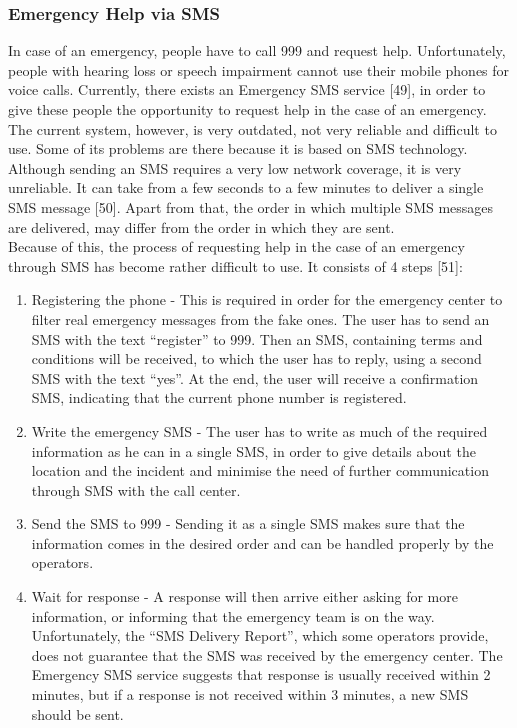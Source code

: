 \documentclass{article}
\begin{document}
\subsubsection{Emergency Help via SMS}
In case of an emergency, people have to call 999 and request help. Unfortunately, people with hearing loss or speech impairment cannot use their mobile phones for voice calls. Currently, there exists an Emergency SMS service [49], in order to give these people the opportunity to request help in the case of an emergency.\\

The current system, however, is very outdated, not very reliable and difficult to use. Some of its problems are there because it is based on SMS technology. Although sending an SMS requires a very low network coverage, it is very unreliable. It can take from a few seconds to a few minutes to deliver a single SMS message [50]. Apart from that, the order in which multiple SMS messages are delivered, may differ from the order in which they are sent. \\

Because of this, the process of requesting help in the case of an emergency through SMS has become rather difficult to use. It consists of 4 steps [51]:
\begin{enumerate}
\item Registering the phone - This is required in order for the emergency center to filter real emergency messages from the fake ones. The user has to send an SMS with the text “register” to 999. Then an SMS, containing terms and conditions will be received, to which the user has to reply, using a second SMS with the text “yes”. At the end, the user will receive a confirmation SMS, indicating that the current phone number is registered.
\item Write the emergency SMS - The user has to write as much of the required information as he can in a single SMS, in order to give details about the location and the incident and minimise the need of further communication through SMS with the call center.
\item Send the SMS to 999 - Sending it as a single SMS makes sure that the information comes in the desired order and can be handled properly by the operators.
\item Wait for response - A response will then arrive either asking for more information, or informing that the emergency team is on the way. Unfortunately, the “SMS Delivery Report”, which some operators provide, does not guarantee that the SMS was received by the emergency center. The Emergency SMS service suggests that response is usually received within 2 minutes, but if a response is not received within 3 minutes, a new SMS should be sent.
\end{enumerate}
\end{document}
